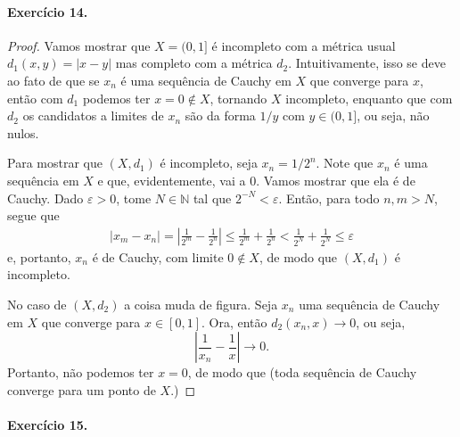 \documentclass[12pt,a4paper]{article}
\begin{document}
\paragraph{Exercício 14.}
\begin{proof}
Vamos mostrar que $X = (0,1]$ é incompleto com a métrica usual $d_1(x,y) = |x-y|$ mas completo com a métrica $d_2$. Intuitivamente,
isso se deve ao fato de que se $x_n$ é uma sequência de Cauchy em $X$ que converge para $x$, então com $d_1$ podemos ter
$x=0\notin X$, tornando $X$ incompleto, enquanto que com $d_2$ os candidatos a limites de $x_n$ são da forma $1/y$ com $y\in (0,1]$, ou seja, não nulos.

Para mostrar que $(X, d_1)$ é incompleto, seja $x_n = 1/2^n$. Note que $x_n$ é uma sequência em $X$ e que, evidentemente, vai 
a $0$. Vamos mostrar que ela é de Cauchy. Dado $\varepsilon > 0$, tome $N\in\mathbb{N}$ tal que $2^{-N} < \varepsilon$. Então, para todo $n,m > N$, segue que
\begin{align*}
    |x_m - x_n| = \left| \frac{1}{2^m} - \frac{1}{2^n} \right| \leq \frac{1}{2^m} + \frac{1}{2^n} < \frac{1}{2^N} + \frac{1}{2^N} 
    \leq \varepsilon
\end{align*}
e, portanto, $x_n$ é de Cauchy, com limite $0\notin X$, de modo que $(X, d_1)$ é incompleto.

No caso de $(X, d_2)$ a coisa muda de figura. Seja $x_n$ uma sequência de Cauchy em $X$ que converge para $x\in [0,1]$. Ora, então
$d_2(x_n,x) \to 0$, ou seja,
\begin{equation*}
    \left| \frac{1}{x_n} - \frac{1}{x} \right| \to 0.
\end{equation*}
Portanto, não podemos ter $x=0$, de modo que 
(toda sequência de Cauchy converge para um ponto de $X$.)
\end{proof}

\paragraph{Exercício 15.}
\end{document}
